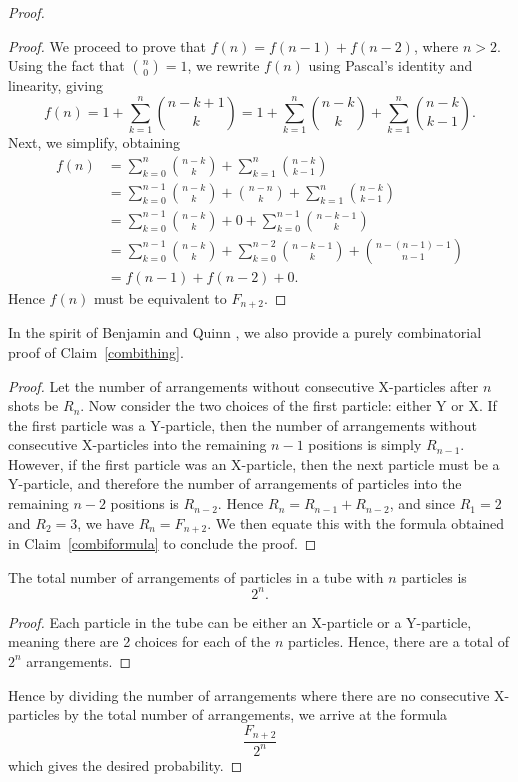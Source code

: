 \begin{proof}
\begin{proof}
  We proceed to prove that $f(n) = f(n-1) + f(n-2)$, where $n > 2$. Using the fact that $\binom{n}{0} = 1$, we rewrite $f(n)$ using Pascal's identity and linearity, giving \[
    f(n) = 1 + \sum_{k=1}^n \binom{n-k+1}{k} = 1 + \sum_{k=1}^n \binom{n-k}{k} + \sum_{k=1}^n \binom{n-k}{k-1}.
  \] Next, we simplify, obtaining
  \begin{align*}
    f(n) &= \sum_{k=0}^n \binom{n - k}{k} + \sum_{k=1}^n \binom{n-k}{k-1} \\
         &= \sum_{k=0}^{n-1} \binom{n-k}{k} + \binom{n-n}{k} + \sum_{k=1}^n \binom{n-k}{k-1} \\
         &= \sum_{k=0}^{n-1} \binom{n-k}{k} + 0 + \sum_{k=0}^{n-1} \binom{n-k-1}{k} \\
         &= \sum_{k=0}^{n-1} \binom{n-k}{k} + \sum_{k=0}^{n-2} \binom{n-k-1}{k} + \binom{n-(n-1)-1}{n-1} \\
         &= f(n-1) + f(n-2) + 0.
  \end{align*}
  Hence $f(n)$ must be equivalent to $F_{n+2}$.
\end{proof}
In the spirit of Benjamin and Quinn \cite{combibook}, we also provide a purely combinatorial proof of Claim~\ref{combithing}.
\begin{proof}
  Let the number of arrangements without consecutive X-particles after $n$ shots be $R_n$. Now consider the two choices of the first particle: either Y or X. If the first particle was a Y-particle, then the number of arrangements without consecutive X-particles into the remaining $n-1$ positions is simply $R_{n-1}$. However, if the first particle was an X-particle, then the next particle must be a Y-particle, and therefore the number of arrangements of particles into the remaining $n-2$ positions is $R_{n-2}$. Hence $R_{n} = R_{n-1} + R_{n-2}$, and since $R_1 = 2$ and  $R_2 = 3$, we have $R_{n} = F_{n+2}$. We then equate this with the formula obtained in Claim~\ref{combiformula} to conclude the proof.
\end{proof}
\begin{claim}
  The total number of arrangements of particles in a tube with $n$ particles is \[2^n.\]
\end{claim}
\begin{proof}
  Each particle in the tube can be either an X-particle or a Y-particle, meaning there are 2 choices for each of the $n$ particles. Hence, there are a total of $2^n$ arrangements.
\end{proof}
Hence by dividing the number of arrangements where there are no consecutive X-particles by the total number of arrangements, we arrive at the formula \[\frac{F_{n+2}}{2^n}\] which gives the desired probability.
\end{proof}

